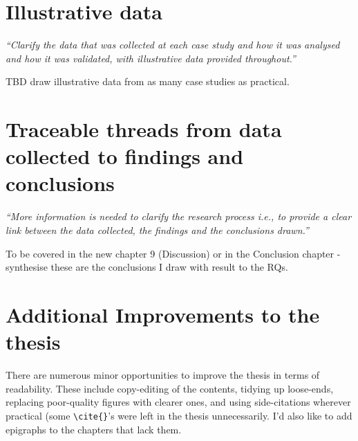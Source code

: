 \section{Illustrative data}
\emph{``Clarify the data that was collected at each case study and how it was analysed and how it was validated, with illustrative data provided throughout.''}

TBD draw illustrative data from as many case studies as practical.

\section{Traceable threads from data collected to findings and conclusions}
\emph{``More information is needed to clarify the research process i.e., to provide a clear link between the data collected, the findings and the conclusions drawn.''}

To be covered in the new chapter 9 (Discussion) or in the Conclusion chapter - synthesise these are the conclusions I draw with result to the RQs.

\section{}

\section{}

\section{}

\section{}

\section{}

\section{}

\section{Additional Improvements to the thesis}
There are numerous minor opportunities to improve the thesis in terms of readability. These include copy-editing of the contents, tidying up loose-ends, replacing poor-quality figures with clearer ones, and using side-citations wherever practical (some \verb+\cite{}+'s were left in the thesis unnecessarily. I'd also like to add epigraphs to the chapters that lack them.

